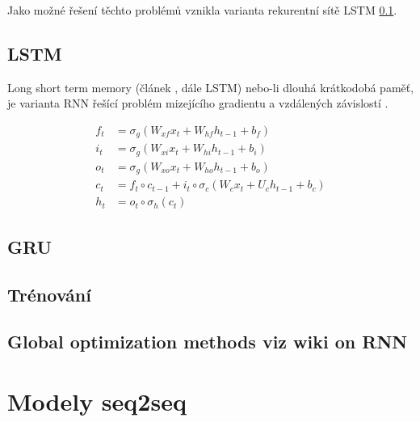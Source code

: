 Jako možné řešení těchto problémů vznikla varianta rekurentní sítě LSTM \ref{section:LSTM}.




\subsection{LSTM}\label{section:LSTM}
Long short term memory (článek \cite{LSTM}, dále LSTM) nebo-li dlouhá krátkodobá paměť, je varianta RNN řešící problém mizejícího gradientu a vzdálených závislostí .

\begin{align}
    f_{t}&=\sigma _{g}(W_{xf}x_{t}+W_{hf}h_{t-1}+b_{f})\\
    i_{t}&=\sigma _{g}(W_{xi}x_{t}+W_{hi}h_{t-1}+b_{i})\\
    o_{t}&=\sigma _{g}(W_{xo}x_{t}+W_{ho}h_{t-1}+b_{o})\\
    c_{t}&=f_{t}\circ c_{t-1}+i_{t}\circ \sigma_{c}(W_{c}x_{t}+U_{c}h_{t-1}+b_{c})\\
    h_{t}&=o_{t}\circ \sigma _{h}(c_{t})
\end{align}

\subsection{GRU}\label{section:GRU}


\subsection{Trénování}

\subsection{Global optimization methods viz wiki on RNN}




\section{Modely seq2seq}


